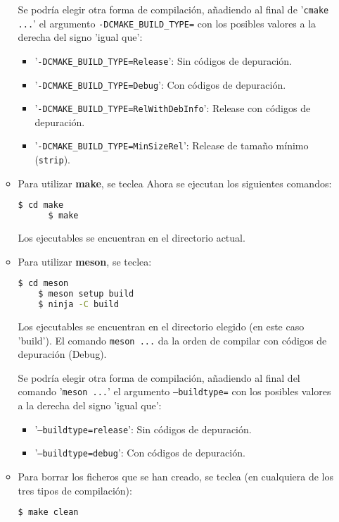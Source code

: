 \begin{enumerate}
\begin{itemize}
    Se podría elegir otra forma de compilación, añadiendo al final de '\texttt{cmake ...}'
    el argumento \texttt{-DCMAKE\_BUILD\_TYPE=} con los posibles valores a la derecha del signo 'igual que':
    \vspace{-\topsep}
    \begin{itemize}
      \tightlist
    \item '\texttt{-DCMAKE\_BUILD\_TYPE=Release}': Sin códigos de depuración.
    \item '\texttt{-DCMAKE\_BUILD\_TYPE=Debug}': Con códigos de depuración.
    \item '\texttt{-DCMAKE\_BUILD\_TYPE=RelWithDebInfo}': Release con códigos de depuración.
    \item '\texttt{-DCMAKE\_BUILD\_TYPE=MinSizeRel}': Release de tamaño mínimo (\texttt{strip}).
    \end{itemize}
  \item Para utilizar \textbf{make}, se teclea
    Ahora se ejecutan los siguientes comandos:
    \begin{lstlisting}[language=bash]
      $ cd make
      $ make
    \end{lstlisting}
    Los ejecutables se encuentran en el directorio actual.
  \item Para utilizar \textbf{meson}, se teclea:
    \begin{lstlisting}[language=bash]
    $ cd meson
    $ meson setup build
    $ ninja -C build
  \end{lstlisting}
  Los ejecutables se encuentran en el directorio elegido (en este caso 'build').
  El comando \texttt{meson ...} da la orden de compilar con códigos de depuración (\textsf{Debug}).

  Se podría elegir otra forma de compilación, añadiendo al final del comando '\texttt{meson ...}'
  el argumento \texttt{--buildtype=} con los posibles valores a la derecha del signo 'igual que':
  \vspace{-\topsep}
  \begin{itemize}
    \tightlist
  \item '\texttt{--buildtype=release}': Sin códigos de depuración.
  \item '\texttt{--buildtype=debug}': Con códigos de depuración.
  \end{itemize}

\item Para borrar los ficheros que se han creado, se teclea (en cualquiera de los tres tipos de compilación):
  \begin{lstlisting}[language=bash]
    $ make clean
  \end{lstlisting}
  \end{itemize}
\end{enumerate}






